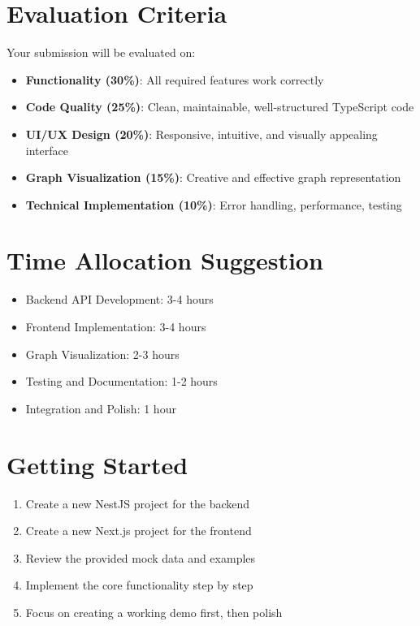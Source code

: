 \documentclass[11pt,a4paper]{article}
\begin{document}
\section{Evaluation Criteria}

Your submission will be evaluated on:

\begin{itemize}
    \item \textbf{Functionality (30\%)}: All required features work correctly
    \item \textbf{Code Quality (25\%)}: Clean, maintainable, well-structured TypeScript code
    \item \textbf{UI/UX Design (20\%)}: Responsive, intuitive, and visually appealing interface
    \item \textbf{Graph Visualization (15\%)}: Creative and effective graph representation
    \item \textbf{Technical Implementation (10\%)}: Error handling, performance, testing
\end{itemize}

\section{Time Allocation Suggestion}

\begin{itemize}
    \item Backend API Development: 3-4 hours
    \item Frontend Implementation: 3-4 hours
    \item Graph Visualization: 2-3 hours
    \item Testing and Documentation: 1-2 hours
    \item Integration and Polish: 1 hour
\end{itemize}

\section{Getting Started}

\begin{enumerate}
    \item Create a new NestJS project for the backend
    \item Create a new Next.js project for the frontend
    \item Review the provided mock data and examples
    \item Implement the core functionality step by step
    \item Focus on creating a working demo first, then polish
\end{enumerate}
\end{document}
